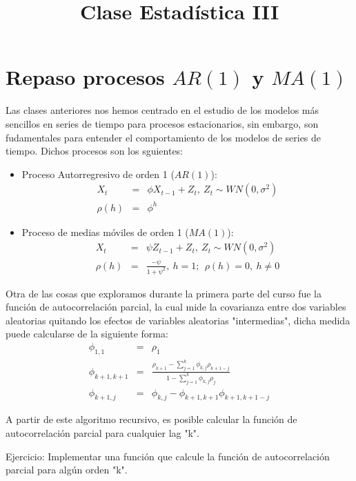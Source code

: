 \documentclass[10pt,a4paper]{article}
\title{Clase Estadística III}
\begin{document}
	\maketitle
	\section{Repaso procesos $AR(1)$ y $MA(1)$}
	
	Las clases anteriores nos hemos centrado en el estudio de los modelos más sencillos en series de tiempo para procesos estacionarios, sin embargo, son fudamentales para entender el comportamiento de los modelos de series de tiempo. Dichos procesos son los sguientes:
	\begin{itemize}
		\item Proceso Autorregresivo de orden 1 ($AR(1)$):
		\begin{eqnarray}
			X_t &=& \phi X_{t-1} + Z_t , \ Z_t \sim WN(0, \sigma^2) \\
			\rho (h) &=& \phi ^h
		\end{eqnarray}
		\item Proceso de medias móviles de orden 1 ($MA(1)$):
		\begin{eqnarray}
			X_t &=& \psi Z_{t-1} + Z_t , \ Z_t \sim WN(0, \sigma^2) \\
			\rho (h) &=& \frac{-\psi}{1+\psi^2}, \ h = 1; \ \ \rho (h) = 0 , \ h \neq 0
		\end{eqnarray}
	\end{itemize}
Otra de las cosas que exploramos durante la primera parte del curso fue la función de autocorrelación parcial, la cual mide la covarianza entre dos variables aleatorias quitando los efectos de variables aleatorias "intermedias", dicha medida puede calcularse de la siguiente forma:
\begin{eqnarray}
	\phi_{1,1} &=& \rho_{1} \\
	\phi_{k+1,k+1} &=& \frac{\rho_{k+1}- \sum_{j=1}^{k}\phi_{k,j}\rho_{k+1-j}}{1-\sum_{j=1}^{k}\phi_{k,j}\rho_{j}}\\
	\phi_{k+1,j} &=& \phi_{k,j} - \phi_{k+1,k+1} \phi_{k+1,k+1-j}
\end{eqnarray}

A partir de  este algoritmo recursivo, es posible calcular la función de autocorrelación parcial para cualquier lag "k".

Ejercicio: Implementar una función que calcule la función de autocorrelación parcial para algún orden "k".
\end{document}
